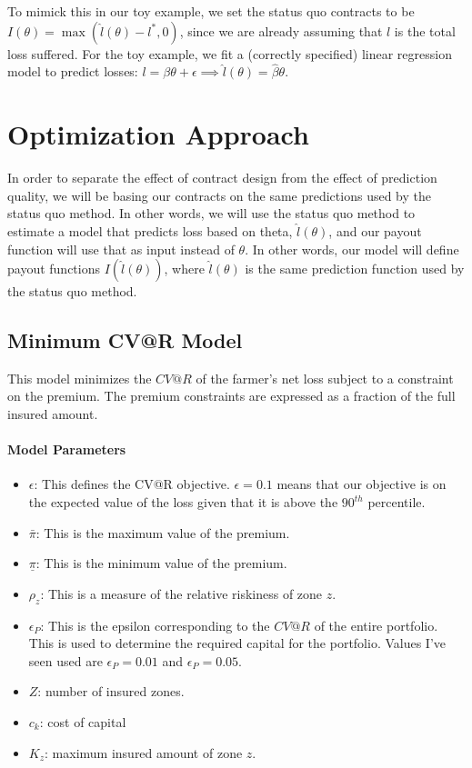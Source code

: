 \documentclass[11pt]{article}
\begin{document}
To mimick this in our toy example, we set the status quo contracts to be $I(\theta) = \max(\hat{l}(\theta)-l^*,0)$, since we are already assuming that $l$ is the total loss suffered. For the toy example, we fit a (correctly specified) linear regression model to predict losses: $l = \beta \theta + \epsilon \implies \hat{l}(\theta) = \hat{\beta}\theta$. 

\section{Optimization Approach}
In order to separate the effect of contract design from the effect of prediction quality, we will be basing our contracts on the same predictions used by the status quo method. In other words, we will use the status quo method to estimate a model that predicts loss based on theta, $\hat{l}(\theta)$, and our payout function will use that as input instead of $\theta$. In other words, our model will define payout functions $I(\hat{l}(\theta))$, where $\hat{l}(\theta)$ is the same prediction function used by the status quo method. 

\subsection*{Minimum CV@R Model}
    This model minimizes the $CV@R$ of the farmer's net loss subject to a constraint on the premium. The premium constraints are expressed as a fraction of the full insured amount. 
    \paragraph*{Model Parameters}
    \begin{itemize}
        \item $\epsilon$: This defines the CV@R objective. $\epsilon = 0.1$ means that our objective is on the expected value of the loss given that it is above the $90^{th}$ percentile. 
        \item $\bar{\pi}$: This is the maximum value of the premium. 
        \item $\underline{\pi}$: This is the minimum value of the premium. 
        \item $\rho_z$: This is a measure of the relative riskiness of zone $z$. 
        \item $\epsilon_P$: This is the epsilon corresponding to the $CV@R$ of the entire portfolio. This is used to determine the required capital for the portfolio. Values I've seen used are $\epsilon_P=0.01$ and $\epsilon_P=0.05$. 
        \item $Z$: number of insured zones.
        \item $c_k$: cost of capital
        \item $K_z$: maximum insured amount of zone $z$.  
    \end{itemize}
\end{document}
